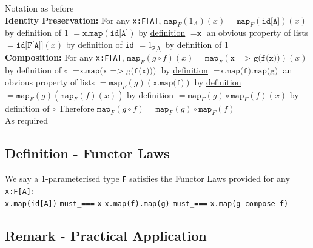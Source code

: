 \documentclass[9pt]{article} %
\begin{document}
Notation as before \newline
\\
\noindent \textbf{Identity Preservation:} For any \texttt{x:F[A]}, \newline
$\texttt{map}_F(1_A)(x) = \texttt{map}_F(\texttt{id[A]})(x)$ by definition of $1$ \newline
$= \texttt{x.map}(\texttt{id[A]})$ by \hyperref[Functor Example]{definition} \newline
$= \texttt{x}$ an obvious property of lists \newline
$= \texttt{id[F[A]]}(x)$ by definition of \texttt{id} \newline
$= 1_{\texttt{F[A]}}$ by definition of $1$ \newline
\\
\noindent \textbf{Composition:} For any \texttt{x:F[A]}, \newline
$\texttt{map}_F(g \circ f)(x) = \texttt{map}_F(\texttt{x => g(f(x))})(x)$ by definition of $\circ$ \newline
$= \texttt{x.map(x => g(f(x)))}$ by \hyperref[Functor Example]{definition} \newline
$= \texttt{x.map(f).map(g)}$ an obvious property of lists \newline
$= \texttt{map}_F(g)(\texttt{x.map(f)})$ by \hyperref[Functor Example]{definition} \newline
$= \texttt{map}_F(g)(\texttt{map}_F(f)(x))$ by \hyperref[Functor Example]{definition} \newline
$= \texttt{map}_F(g) \circ \texttt{map}_F(f)(x)$ by definition of $\circ$ \newline
Therefore $\texttt{map}_F(g \circ f) = \texttt{map}_F(g) \circ \texttt{map}_F(f)$ \newline
\\
\noindent As required \blacksquare

\subsection{Definition - Functor Laws}

We say a 1-parameterised type \texttt{F} satisfies the Functor Laws provided for any \texttt{x:F[A]}:
\\
\noindent \texttt{x.map(id[A])} \texttt{must\_===} \texttt{x} \newline
\texttt{x.map(f).map(g)} \texttt{must\_===} \texttt{x.map(g compose f)} \newline

\subsection{Remark - Practical Application}
\end{document}
